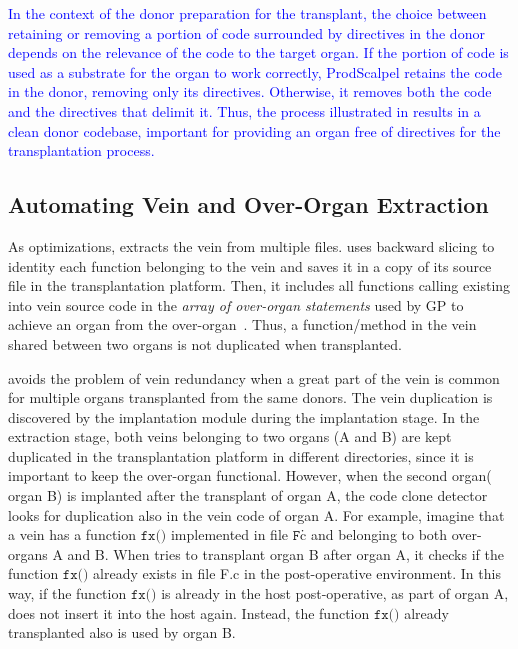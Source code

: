 \textcolor{blue}{In the context of the donor preparation for the transplant, the choice between retaining or removing a portion of code surrounded by directives in the donor depends on the relevance of the code to the target organ. If the portion of code is used as a substrate for the organ to work correctly, ProdScalpel retains the code in the donor, removing only its directives. Otherwise, it removes both the code and the directives that delimit it. Thus, the process illustrated in  results in a clean donor codebase, important for providing an organ free of directives for the transplantation process.} 

\subsection{Automating Vein and Over-Organ Extraction}
As optimizations, \prodscalpel extracts the vein from multiple files. \prodscalpel uses backward slicing to identity each function belonging to the vein and saves it in a copy of its source file in the transplantation platform. Then, it includes all functions calling existing into vein source code in the \emph{array of over-organ statements} used by GP to achieve an organ from the over-organ~\cite{Barr2015}. Thus,  a function/method in the vein shared between two organs is not duplicated when transplanted.

\prodscalpel avoids the problem of vein redundancy when a great part of the vein is common for multiple organs transplanted from the same donors. The vein duplication is discovered by the implantation module during the implantation stage. In the extraction stage, both veins belonging to two organs (A and B) are kept duplicated in the transplantation platform in different directories, since it is important to keep the over-organ functional. However, when the second organ( organ B) is implanted after the transplant of organ A, the code clone detector looks for duplication also in the vein code of organ A. For example, imagine that a vein has a function $\texttt{fx()}$ implemented in file $\texttt{F\.c}$ and belonging to both over-organs A and B. When \prodscalpel tries to transplant organ B after organ A, it checks if the function  $\texttt{fx()}$ already exists in file F.c in the post-operative environment. In this way, if the function  $\texttt{fx()}$ is already in the host post-operative, as part of organ A, \prodscalpel does not insert it into the host again. Instead, the function $\texttt{fx()}$ already transplanted also is used by organ B.

